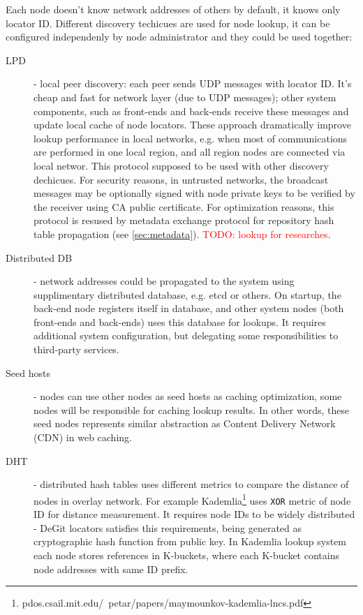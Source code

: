\documentclass[12pt,oneside]{article}
\newcommand{\code}[1]{\texttt{#1}}
\newcommand{\todo}[1]{\textcolor{red}{TODO: #1}}
\begin{document}
Each node doesn't know network addresses of others by default, it knows only locator ID.
Different discovery techicues are used for node lookup, it can be configured independenly by node
administrator and they could be used together:

\begin{description}
  \item[LPD] - local peer discovery: each peer sends UDP messages with locator ID.
    It's cheap and fast for network layer (due to UDP messages); other system components,
    such as front-ends and back-ends receive these messages and update local cache of node locators.
    These approach dramatically improve lookup performance in local networks, e.g. when most of communications
    are performed in one local region, and all region nodes are connected via local networ.
    This protocol supposed to be used with other discovery dechicues.
    For security reasons, in untrusted networks, the broadcast messages may be optionally signed with
    node private keys to be verified by the receiver using CA public certificate.
    For optimization reasons, this protocol is resused by metadata exchange protocol for
    repository hash table propagation (see \ref{sec:metadata}). \todo{lookup for researches}.
  \item[Distributed DB] - network addresses could be propagated to the system using supplimentary distributed
    database, e.g. etcd or others. On startup, the back-end node registers itself in database,
    and other system nodes (both front-ends and back-ends) uses this database for lookups. 
    It requires additional system configuration, but delegating some responsibilities to third-party services.
  \item[Seed hosts] - nodes can use other nodes as seed hosts as caching optimization, some nodes
    will be responsible for caching lookup results. In other words, these seed nodes represents similar abstraction
    as Content Delivery Network (CDN) in web caching.
  \item[DHT] - distributed hash tables uses different metrics to compare the distance of nodes in overlay network.
    For example Kademlia\footnote{pdos.csail.mit.edu/~petar/papers/maymounkov-kademlia-lncs.pdf} uses
    \code{XOR} metric of node ID for distance measurement. It requires node IDs to be widely distributed -
    DeGit locators satisfies this requirements, being generated as cryptographic hash function from
    public key. In Kademlia lookup system each node stores references in K-buckets, where each K-bucket
    contains node addresses with same ID prefix.
\end{description}
\end{document}
